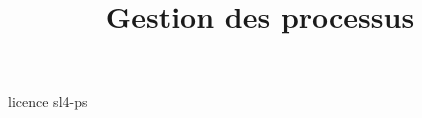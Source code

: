 \documentclass [xcolor=table] {beamer}
\title {Gestion des processus}
\begin{document}
 {licence}
 {sl4-ps}
\end{document}
